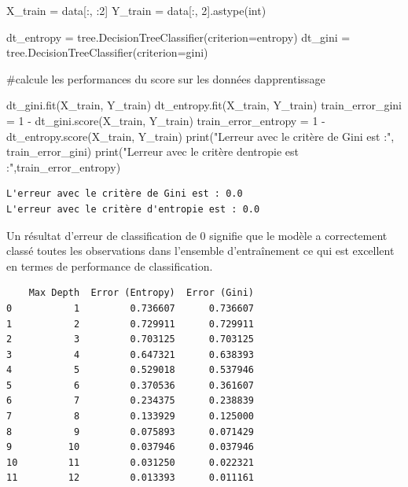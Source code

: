 \documentclass[
  letterpaper,
  DIV=11,
  numbers=noendperiod]{scrartcl}
\newenvironment{Shaded}{\begin{snugshade}}{\end{snugshade}}
\newcommand{\BuiltInTok}[1]{\textcolor[rgb]{0.00,0.23,0.31}{#1}}
\newcommand{\CommentTok}[1]{\textcolor[rgb]{0.37,0.37,0.37}{#1}}
\newcommand{\DecValTok}[1]{\textcolor[rgb]{0.68,0.00,0.00}{#1}}
\newcommand{\NormalTok}[1]{\textcolor[rgb]{0.00,0.23,0.31}{#1}}
\newcommand{\OperatorTok}[1]{\textcolor[rgb]{0.37,0.37,0.37}{#1}}
\newcommand{\StringTok}[1]{\textcolor[rgb]{0.13,0.47,0.30}{#1}}
\begin{document}
\begin{Shaded}
\begin{Highlighting}[]
\NormalTok{X\_train }\OperatorTok{=}\NormalTok{ data[:, :}\DecValTok{2}\NormalTok{]}
\NormalTok{Y\_train }\OperatorTok{=}\NormalTok{ data[:, }\DecValTok{2}\NormalTok{].astype(}\BuiltInTok{int}\NormalTok{)}

\NormalTok{dt\_entropy }\OperatorTok{=}\NormalTok{ tree.DecisionTreeClassifier(criterion}\OperatorTok{=}\StringTok{\textquotesingle{}entropy\textquotesingle{}}\NormalTok{)}
\NormalTok{dt\_gini }\OperatorTok{=}\NormalTok{ tree.DecisionTreeClassifier(criterion}\OperatorTok{=}\StringTok{\textquotesingle{}gini\textquotesingle{}}\NormalTok{)}

\CommentTok{\#calcule les performances du score sur les données d\textquotesingle{}apprentissage}

\NormalTok{dt\_gini.fit(X\_train, Y\_train)}
\NormalTok{dt\_entropy.fit(X\_train, Y\_train)}
\NormalTok{train\_error\_gini }\OperatorTok{=} \DecValTok{1} \OperatorTok{{-}}\NormalTok{ dt\_gini.score(X\_train, Y\_train)}
\NormalTok{train\_error\_entropy }\OperatorTok{=} \DecValTok{1} \OperatorTok{{-}}\NormalTok{ dt\_entropy.score(X\_train, Y\_train)}
\BuiltInTok{print}\NormalTok{(}\StringTok{"L\textquotesingle{}erreur avec le critère de Gini est :"}\NormalTok{, train\_error\_gini)}
\BuiltInTok{print}\NormalTok{(}\StringTok{"L\textquotesingle{}erreur avec le critère d\textquotesingle{}entropie est :"}\NormalTok{,train\_error\_entropy)}
\end{Highlighting}
\end{Shaded}

\begin{verbatim}
L'erreur avec le critère de Gini est : 0.0
L'erreur avec le critère d'entropie est : 0.0
\end{verbatim}

Un résultat d'erreur de classification de 0 signifie que le modèle a
correctement classé toutes les observations dans l'ensemble
d'entraînement ce qui est excellent en termes de performance de
classification.

\begin{verbatim}
    Max Depth  Error (Entropy)  Error (Gini)
0           1         0.736607      0.736607
1           2         0.729911      0.729911
2           3         0.703125      0.703125
3           4         0.647321      0.638393
4           5         0.529018      0.537946
5           6         0.370536      0.361607
6           7         0.234375      0.238839
7           8         0.133929      0.125000
8           9         0.075893      0.071429
9          10         0.037946      0.037946
10         11         0.031250      0.022321
11         12         0.013393      0.011161
\end{verbatim}
\end{document}
